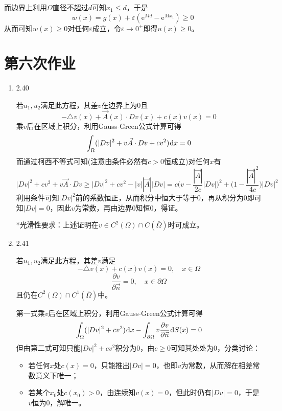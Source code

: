 \documentclass[a4paper,UTF8,fontset=windows,10pt]{ctexart}
\newcommand*{\dr}{\hspace{0.07em}\mathrm{d}}
\newcommand*{\er}{\mathrm{e}}
\begin{document}
\begin{enumerate}
    而边界上利用$\Omega$直径不超过$d$可知$x_1\le d$，于是
    $$w(x)=g(x)+\varepsilon(\er^{Md}-\er^{Mx_1})\ge0$$
    从而可知$w(x)\ge0$对任何$\varepsilon$成立，令$\varepsilon\to 0^+$即得$u(x)\ge0$。
\end{enumerate}

\section{第六次作业}
\begin{enumerate}
    \item 2.40
    
    若$u_1,u_2$满足此方程，其差$v$在边界上为0且
    $$-\triangle v(x)+\vec{A}(x)\cdot Dv(x)+c(x)v(x)=0$$
    乘$v$后在区域上积分，利用Gauss-Green公式计算可得
    $$\int_\Omega(|Dv|^2+v\vec{A}\cdot Dv+cv^2)\dr x=0$$
    而通过柯西不等式可知(注意由条件必然有$c>0$恒成立)对任何$x$有
    $$|Dv|^2+cv^2+v\vec{A}\cdot Dv\ge|Dv|^2+cv^2-|v||\vec{A}||Dv|=c\bigg(v-\frac{|\vec{A}|}{2c}|Dv|\bigg)^2+\bigg(1-\frac{|\vec{A}|^2}{4c}\bigg)|Dv|^2$$
    利用条件可知$|Dv|^2$前的系数恒正，从而积分中恒大于等于0，再从积分为0即可知$|Dv|=0$，因此$v$为常数，再由边界0知恒0，得证。
    
    *光滑性要求：上述证明在$v\in C^2(\Omega)\cap C(\bar\Omega)$时可成立。
    
    \item 2.41
    
    若$u_1,u_2$满足此方程，其差$v$满足
    $$-\triangle v(x)+c(x)v(x)=0,\quad x\in\Omega$$
    $$\frac{\partial v}{\partial\vec{n}}=0,\quad x\in\partial\Omega$$
    且仍在$C^2(\Omega)\cap C^1(\bar\Omega)$中。
    
    第一式乘$v$后在区域上积分，利用Gauss-Green公式计算可得
    $$\int_\Omega(|Dv|^2+cv^2)\dr x-\int_{\partial\Omega}v\frac{\partial v}{\partial\vec{n}}\dr S(x)=0$$
    但由第二式可知只能$|Dv|^2+cv^2$积分为0，由$c\ge0$可知其处处为0，分类讨论：
    \begin{itemize}
        \item 若任何$x$处$c(x)=0$，只能推出$|Dv|=0$，也即$v$为常数，从而解在相差常数意义下唯一；
        \item 若某个$x_0$处$c(x_0)>0$，由连续知$v(x)=0$，但此时仍有$|Dv|=0$，于是$v$恒为0，解唯一。
    \end{itemize}
    

\end{enumerate}
\end{document}
